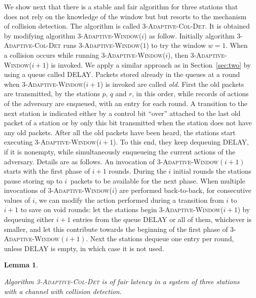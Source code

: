 \documentclass[11pt]{article}
\newtheorem{lemma}{Lemma}
\begin{document}
We show next that there is a stable and fair algorithm for three stations that does not rely on the knowledge of the window but but resorts to the mechanism of collision detection.
The algorithm is called \textsc{3-Adaptive-Col-Det}.
It is obtained by modifying algorithm \textsc{3-Adaptive-Window($i$)} as follow.
Initially algorithm \textsc{3-Adaptive-Col-Det} runs \textsc{3-Adaptive-Window($1$)} to try the window $w=1$.
When a collision occurs while running \textsc{3-Adaptive-Window($i$)}, then \textsc{3-Adaptive-Window($i+1$)} is invoked.
We apply a similar approach as in Section~\ref{sec:two} by using a queue called DELAY.
Packets stored already in the queues at a round  when \textsc{3-Adaptive-Window($i+1$)} is invoked are called \emph{old}.
First the old packets are transmitted, by the stations $p$, $q$ and $r$, in this order, while records of actions of the adversary are enqueued, with an entry for each round.
A transition to the next station is indicated either by a control bit ``over'' attached to the last old packet of a station or by only this bit transmitted when the station does not have any old packets.
After all the old packets have been heard, the stations start executing \textsc{3-Adaptive-Window($i+1$)}.
To this end, they keep dequeuing DELAY, if it is nonempty, while simultaneously enqueueing the current actions of the adversary.
Details are as follows.
An invocation of \textsc{3-Adaptive-Window$(i+1)$} starts with the first phase of $i+1$ rounds. 
During the $i$ initial rounds the stations pause storing up to $i$~packets to be available for the next phase.
When multiple invocations of \textsc{3-Adaptive-Window($i$)} are performed back-to-back, for consecutive values of $i$, we can modify the action performed during a transition from $i$ to $i+1$ to save on void rounds: let the stations begin  \textsc{3-Adaptive-Window($i+1$)} by dequeuing either $i+1$ entries from the queue DELAY or all of them, whichever is smaller, and let this contribute towards the beginning of the first phase of \textsc{3-Adaptive-Window$(i+1)$}.
Next the stations dequeue one entry per round, unless DELAY is empty, in which case it is not used.



\begin{lemma}
\label{lem:3-adaptive-col-det}

Algorithm \textsc{3-Adaptive-Col-Det} is of fair latency in a system of three stations with a channel with collision detection.
\end{lemma}
\end{document}
